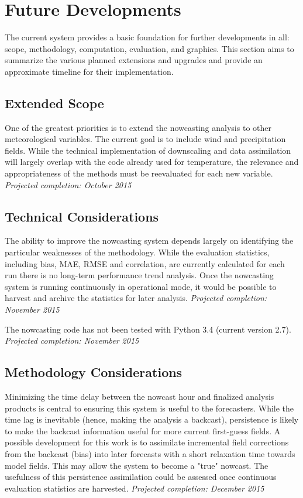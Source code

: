\documentclass{article}
\begin{document}
\newpage
\section{Future Developments}
The current system provides a basic foundation for further developments in all: scope, methodology, computation, evaluation, and graphics. This section aims to summarize the various planned extensions and upgrades and provide an approximate timeline for their implementation. 

\subsection{Extended Scope}
One of the greatest priorities is to extend the nowcasting analysis to other meteorological variables. The current goal is to include wind and precipitation fields. While the technical implementation of downscaling and data assimilation will largely overlap with the code already used for temperature, the relevance and appropriateness of the methods must be reevaluated for each new variable. \emph{Projected completion: October 2015}

\subsection{Technical Considerations}

The ability to improve the nowcasting system depends largely on identifying the particular weaknesses of the methodology. While the evaluation statistics, including bias, MAE, RMSE and correlation, are currently calculated for each run there is no long-term performance trend analysis. Once the nowcasting system is running continuously in operational mode, it would be possible to harvest and archive the statistics for later analysis. \emph{Projected completion: November 2015}

The nowcasting code has not been tested with Python 3.4 (current version 2.7). \emph{Projected completion: November 2015}

\subsection{Methodology Considerations}
Minimizing the time delay between the nowcast hour and finalized analysis products is central to ensuring this system is useful to the forecasters. While the time lag is inevitable (hence, making the analysis a backcast), persistence is likely to make the backcast information useful for more current first-guess fields. A possible development for this work is to assimilate incremental field corrections from the backcast (bias) into later forecasts with a short relaxation time towards model fields. This may allow the system to become a "true" nowcast. The usefulness of this persistence assimilation could be assessed once continuous evaluation statistics are harvested. \emph{Projected completion: December 2015}
\end{document}

